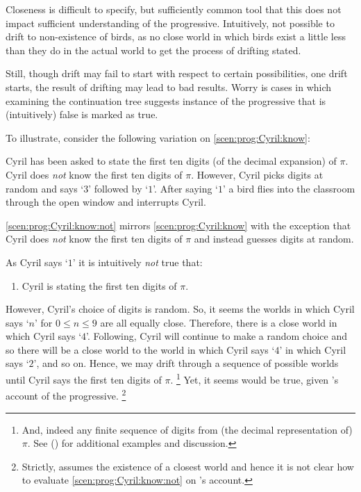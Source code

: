 \begin{note}
  Closeness is difficult to specify, but sufficiently common tool that this does not impact sufficient understanding of the progressive.
  Intuitively, not possible to drift to non-existence of birds, as no close world in which birds exist a little less than they do in the actual world to get the process of drifting stated.
\end{note}

\begin{note}
  Still, though drift may fail to start with respect to certain possibilities, one drift starts, the result of drifting may lead to bad results.
  Worry is cases in which examining the continuation tree suggests instance of the progressive that is (intuitively) false is marked as true.

  To illustrate, consider the following variation on \autoref{scen:prog:Cyril:know}:

  \begin{scenario}
    \label{scen:prog:Cyril:know:not}
    Cyril has been asked to state the first ten digits (of the decimal expansion) of \(\pi\).
    Cyril does \emph{not} know the first ten digits of \(\pi\).
    However, Cyril picks digits at random and says `\(3\)' followed by `\(1\)'.
    After saying `\(1\)' a bird flies into the classroom through the open window and interrupts Cyril.
  \end{scenario}

  \autoref{scen:prog:Cyril:know:not} mirrors \autoref{scen:prog:Cyril:know} with the exception that Cyril does \emph{not} know the first ten digits of \(\pi\) and instead guesses digits at random.

  As Cyril says `\(1\)' it is intuitively \emph{not} true that:
  \begin{enumerate}
  \item
    \label{Cyril:pi:progressive:again}
    Cyril is stating the first ten digits of \(\pi\).
  \end{enumerate}

  However, Cyril's choice of digits is random.
  So, it seems the worlds in which Cyril says `\(n\)' for \(0 \leq n \leq 9\) are all equally close.
  Therefore, there is a close world in which Cyril says `\(4\)'.
  Following, Cyril will continue to make a random choice and so there will be a close world to the world in which Cyril says `\(4\)' in which Cyril says `\(2\)', and so on.
  Hence, we may drift through a sequence of possible worlds until Cyril says the first ten digits of \(\pi\).%
  \footnote{
    And, indeed any finite sequence of digits from (the decimal representation of) \(\pi\).
    See \citeauthor{Landman:1992wh} (\citeyear[\S2.3]{Landman:1992wh}) for additional examples and discussion.
  }
  Yet, it seems \label{Cyril:pi:progressive:again} would be true, given \citeauthor{Landman:1992wh}'s account of the progressive.%
  \footnote{
    Strictly, \citeauthor{Landman:1992wh} assumes the existence of a closest world and hence it is not clear how to evaluate \autoref{scen:prog:Cyril:know:not} on \citeauthor{Landman:1992wh}'s account.

}
\end{note}
